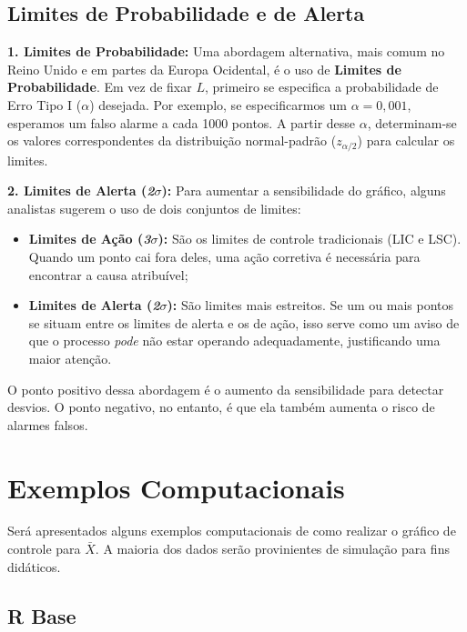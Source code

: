 \documentclass[
  portuguese,
  11pt,
  a4paper,
  DIV=11,
  numbers=noendperiod]{scrreprt}
\providecommand{\tightlist}{%
  \setlength{\itemsep}{0pt}\setlength{\parskip}{0pt}}
\begin{document}
\subsection{Limites de Probabilidade e de
Alerta}\label{limites-de-probabilidade-e-de-alerta}

\textbf{1. Limites de Probabilidade:} Uma abordagem alternativa, mais
comum no Reino Unido e em partes da Europa Ocidental, é o uso de
\textbf{Limites de Probabilidade}. Em vez de fixar \(L\), primeiro se
especifica a probabilidade de Erro Tipo I (\(\alpha\)) desejada. Por
exemplo, se especificarmos um \(\alpha = 0,001\), esperamos um falso
alarme a cada 1000 pontos. A partir desse \(\alpha\), determinam-se os
valores correspondentes da distribuição normal-padrão (\(z_{\alpha/2}\))
para calcular os limites.

\textbf{2. Limites de Alerta (\emph{2\(\sigma\)}):} Para aumentar a
sensibilidade do gráfico, alguns analistas sugerem o uso de dois
conjuntos de limites:

\begin{itemize}
\tightlist
\item
  \textbf{Limites de Ação (\emph{3\(\sigma\)}):} São os limites de
  controle tradicionais (LIC e LSC). Quando um ponto cai fora deles, uma
  ação corretiva é necessária para encontrar a causa atribuível;
\item
  \textbf{Limites de Alerta (\emph{2\(\sigma\)}):} São limites mais
  estreitos. Se um ou mais pontos se situam entre os limites de alerta e
  os de ação, isso serve como um aviso de que o processo \emph{pode} não
  estar operando adequadamente, justificando uma maior atenção.
\end{itemize}

O ponto positivo dessa abordagem é o aumento da sensibilidade para
detectar desvios. O ponto negativo, no entanto, é que ela também aumenta
o risco de alarmes falsos.

\section{Exemplos Computacionais}\label{exemplos-computacionais}

Será apresentados alguns exemplos computacionais de como realizar o
gráfico de controle para \(\bar{X}\). A maioria dos dados serão
provinientes de simulação para fins didáticos.

\subsection{R Base}
\end{document}
